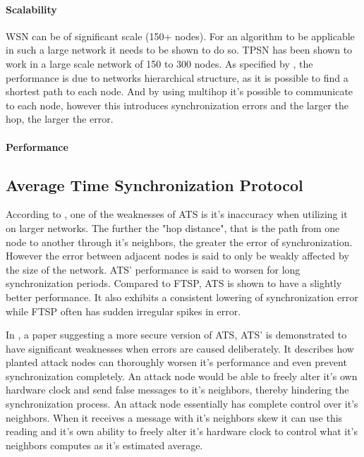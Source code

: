 \documentclass[a4paper,12pt]{article}
\begin{document}
\paragraph{Scalability}

WSN can be of significant scale (150+ nodes). For an algorithm to be applicable in such a large network it needs to be shown to do so. TPSN has been shown to work in a large scale network of 150 to 300 nodes. As specified by \cite{GaneriwalEtAl03}, the performance is due to networks hierarchical structure, as it is possible to find a shortest path to each node. And by using multihop it's possible to communicate to each node, however this introduces synchronization errors and the larger the hop, the larger the error. 

\paragraph{Performance}
    
\cite{Sundararaman05} 


\subsection{Average Time Synchronization Protocol}
According to \citet{SchenatoFiorentin11}, one of the weaknesses of ATS is it's inaccuracy when utilizing it on larger networks. The further the "hop distance", that is the path from one node to another through it's neighbors, the greater the error of synchronization. However the error between adjacent nodes is said to only be weakly affected by the size of the network. ATS' performance is said to worsen for long synchronization periods. Compared to FTSP, ATS is shown to have a slightly better performance. It also exhibits a consistent lowering of synchronization error while FTSP often has sudden irregular spikes in error.


In \citet{HeChengShiChen13}, a paper suggesting a more secure version of ATS, ATS' is demonstrated to have significant weaknesses when errors are caused deliberately. It describes how planted attack nodes can thoroughly worsen it's performance and even prevent synchronization completely. An attack node would be able to freely alter it's own hardware clock and send false messages to it's neighbors, thereby hindering the synchronization process. An attack node essentially has complete control over it's neighbors. When it receives a message with it's neighbors skew it can use this reading and it's own ability to freely alter it's hardware clock to control what it's neighbors computes as it's estimated average.
\end{document}
